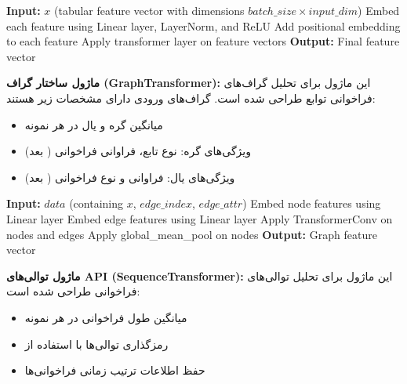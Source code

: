 \documentclass[a4paper,oneside,12pt]{report}
\theoremstyle{definition}
\begin{document}
\begin{algorithm}[!htbp]
\caption{EnhancedTabTransformer Module Structure}
\label{alg:enhanced_tab_transformer}
\begin{algorithmic}[1]
\STATE \textbf{Input:} $x$ (tabular feature vector with dimensions $batch\_size \times input\_dim$)
\STATE Embed each feature using Linear layer, LayerNorm, and ReLU
\STATE Add positional embedding to each feature
    \STATE Apply transformer layer on feature vectors
\ENDFOR
\STATE \textbf{Output:} Final feature vector
\end{algorithmic}
\end{algorithm}

\textbf{ماژول ساختار گراف (GraphTransformer):}
این ماژول برای تحلیل گراف‌های فراخوانی توابع طراحی شده است. گراف‌های ورودی دارای مشخصات زیر هستند:
\begin{itemize}
  \item میانگین  گره و  یال در هر نمونه
  \item ویژگی‌های گره: نوع تابع، فراوانی فراخوانی ( بعد)
  \item ویژگی‌های یال: فراوانی و نوع فراخوانی ( بعد)
\end{itemize}

\begin{algorithm}[!htbp]
\caption{GraphTransformer Module Structure}
\label{alg:graph_transformer}
\begin{algorithmic}[1]
\STATE \textbf{Input:} $data$ (containing $x$, $edge\_index$, $edge\_attr$)
\STATE Embed node features using Linear layer
    \STATE Embed edge features using Linear layer
\ENDIF
{}
    \STATE Apply TransformerConv on nodes and edges
\ENDFOR
\STATE Apply global\_mean\_pool on nodes
\STATE \textbf{Output:} Graph feature vector
\end{algorithmic}
\end{algorithm}

\textbf{ماژول توالی‌های API (SequenceTransformer):}
این ماژول برای تحلیل توالی‌های فراخوانی  طراحی شده است:
\begin{itemize}
  \item میانگین طول  فراخوانی  در هر نمونه
  \item رمزگذاری توالی‌ها با استفاده از 
  \item حفظ اطلاعات ترتیب زمانی فراخوانی‌ها
\end{itemize}
\end{document}

